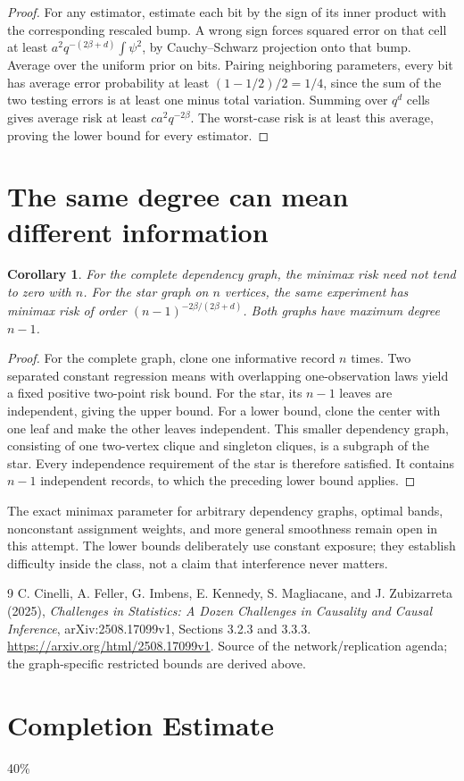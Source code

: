 \documentclass[11pt,a4paper]{article}
\newtheorem{corollary}[theorem]{Corollary}
\theoremstyle{definition}
\theoremstyle{remark}
\begin{document}
\begin{proof}
For any estimator, estimate each bit by the sign of its inner product with the corresponding rescaled bump. A wrong sign forces squared error on that cell at least
$a^2q^{-(2\beta+d)}\int\psi^2$, by Cauchy--Schwarz projection onto that bump. Average over the uniform prior on bits. Pairing neighboring parameters, every bit has average error probability at least $(1-1/2)/2=1/4$, since the sum of the two testing errors is at least one minus total variation. Summing over $q^d$ cells gives average risk at least $c a^2q^{-2\beta}$. The worst-case risk is at least this average, proving the lower bound for every estimator.
\end{proof}
\section{The same degree can mean different information}
\begin{corollary}
For the complete dependency graph, the minimax risk need not tend to zero with $n$. For the star graph on $n$ vertices, the same experiment has minimax risk of order $(n-1)^{-2\beta/(2\beta+d)}$. Both graphs have maximum degree $n-1$.
\end{corollary}
\begin{proof}
For the complete graph, clone one informative record $n$ times. Two separated constant regression means with overlapping one-observation laws yield a fixed positive two-point risk bound. For the star, its $n-1$ leaves are independent, giving the upper bound. For a lower bound, clone the center with one leaf and make the other leaves independent. This smaller dependency graph, consisting of one two-vertex clique and singleton cliques, is a subgraph of the star. Every independence requirement of the star is therefore satisfied. It contains $n-1$ independent records, to which the preceding lower bound applies.
\end{proof}
The exact minimax parameter for arbitrary dependency graphs, optimal bands, nonconstant assignment weights, and more general smoothness remain open in this attempt. The lower bounds deliberately use constant exposure; they establish difficulty inside the class, not a claim that interference never matters.
\begin{thebibliography}{9}
 C. Cinelli, A. Feller, G. Imbens, E. Kennedy, S. Magliacane, and J. Zubizarreta (2025), \emph{Challenges in Statistics: A Dozen Challenges in Causality and Causal Inference}, arXiv:2508.17099v1, Sections 3.2.3 and 3.3.3. \url{https://arxiv.org/html/2508.17099v1}. Source of the network/replication agenda; the graph-specific restricted bounds are derived above.
\end{thebibliography}

\section{Completion Estimate}
40\%
\end{document}
